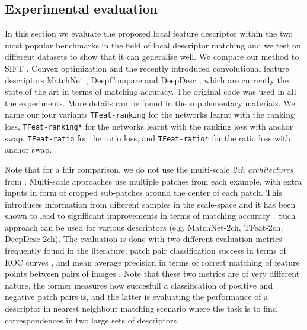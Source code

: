 \subsection{Experimental evaluation}

In this section we evaluate the proposed local feature descriptor
within the two most popular benchmarks in the field of local
descriptor matching and we test on different datasets to show
that it can generalise well. We compare our method to SIFT
\cite{Lowe:2004:DIF:993451.996342}, Convex optimization
\cite{simonyan2014learning} and the recently introduced convolutional
feature descriptors MatchNet \cite{Han_2015_CVPR}, DeepCompare
\cite{ZagoruykoCVPR2015} and DeepDesc \cite{simo2015deepdesc}, which
are currently the state of the art in terms of matching accuracy.  The
original code  was used in all the experiments. More details can be found in the supplementary
materials. We name our four variants \texttt{TFeat-ranking} for the
networks learnt with the ranking loss, \texttt{TFeat-ranking*} for
the networks learnt with the ranking loss with anchor swap,
\texttt{TFeat-ratio} for the ratio loss, and \texttt{TFeat-ratio*} for the
ratio loss with anchor swap.

Note that for a fair comparison, we do not use the multi-scale {\em
  2ch architectures} from \cite{ZagoruykoCVPR2015}. Multi-scale
approaches use multiple patches from each example, with extra inputs
in form of cropped sub-patches around the center of each patch. This
introduces information from different samples in the scale-space and
it has been shown to lead to significant improvements in terms of
matching accuracy \cite{DBLP:journals/corr/DongS14}. Such approach can
be used for various descriptors (e.g. MatchNet-2ch, TFeat-2ch,
DeepDesc-2ch). The evaluation is done with two different evaluation
metrics frequently found in the literature, patch pair classification
success in terms of ROC curves \cite{WHB09}, and mean average
precision in terms of correct matching of feature points between pairs
of images \cite{schmid2003performance}. Note that these two metrics
are of very different nature, the former measures how succesfull a
classification of positive and negative patch pairs is, and the latter
is evaluating the performance of a descriptor in nearest neighbour
matching scenario where the task is to find correspondences in two
large sets of descriptors.

